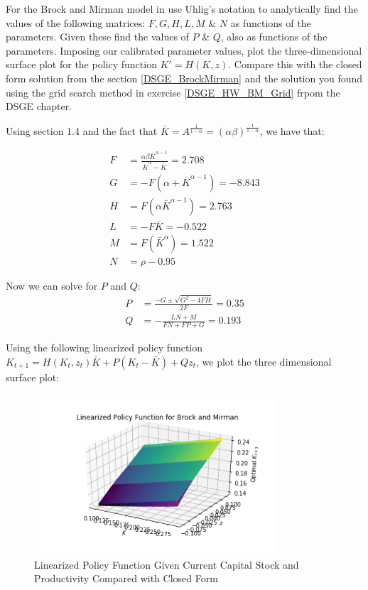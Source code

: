 \documentclass[letterpaper,11pt]{article}
\theoremstyle{definition}
\begin{document}
\begin{spacing}{1.5}
	\setcounter{Exercise}{0}
	\begin{Exercise} \label{Linear_HW_BM_Coeffs}
		For the Brock and Mirman model in use Uhlig's notation to analytically find the values of the following matrices: $F, G, H, L, M$ \& $N$ as functions of the parameters.  Given these find the values of $P$ \& $Q$, also as functions of the parameters.  Imposing our calibrated parameter values, plot the three-dimensional surface plot for the policy function $K' = H(K,z)$.  Compare this with the closed form solution from the section \eqref{DSGE_BrockMirman} and the solution you found using the grid search method in exercise \ref{DSGE_HW_BM_Grid} frpom the DSGE chapter.
	\end{Exercise}

	Using section 1.4 and the fact that $\bar{K} = A^{\frac{1}{1-\alpha}} = (\alpha\beta)^{\frac{1}{1-\alpha}}$, we have that:

	\begin{align*}
		F &= \frac{\alpha\beta\bar{K}^{\alpha-1}}{\bar{K}^\alpha-\bar{K}} = 2.708 \\
		G &= -F(\alpha+\bar{K}^{\alpha-1}) = -8.843 \\
		H &= F(\alpha\bar{K}^{\alpha-1}) = 2.763 \\
		L &= -F\bar{K} = -0.522\\
		M &= F(\bar{K}^\alpha) = 1.522 \\
		N &= \rho - 0.95
	\end{align*}

	Now we can solve for $P$ and $Q$:
	\begin{align*}
		P &= \frac{-G \pm \sqrt{G^2-4FH}}{2F} = 0.35 \\
		Q &= -\frac{LN+M}{FN+FP+G} = 0.193
	\end{align*}

	Using the following linearized policy function $K_{t+1} = H(K_t,z_t) \bar{K}+P(K_t-\bar{K})+Qz_t$, we plot the three dimensional surface plot:

	\begin{figure}[H]
		\caption{Linearized Policy Function Given Current Capital Stock and Productivity Compared with Closed Form}
		\label{fig:brock_and_mirman}
		\includegraphics[width=0.8\textwidth]{Brock_and_Merman_linearized_policy.png}
	\end{figure}


\end{spacing}
\end{document}
